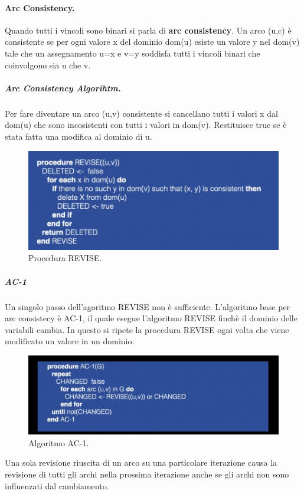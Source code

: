 \paragraph{Arc Consistency.} 
Quando tutti i vincoli sono binari si parla di \textbf{arc consistency}. Un arco (u,c) è consistente se per ogni valore x del dominio dom(u) esiste un valore y nel dom(v) tale che un assegnamento u=x e v=y soddisfa tutti i vincoli binari che coinvolgono sia u che v.

\subparagraph{Arc Consistency Algorihtm.} Per fare diventare un arco (u,v) consistente si cancellano tutti i valori x dal dom(u) che sono incosistenti con tutti i valori in dom(v). Restituisce true se è stata fatta una modifica al dominio di u.
\begin{figure}[H]
    \centering
    \includegraphics[width=13cm, keepaspectratio]{img/arc_consistency.png}
    \caption{Procedura REVISE.}\label{fig:arc_consistency}
\end{figure}


\subparagraph{AC-1} Un singolo passo dell'agoritmo REVISE non è sufficiente. L'algoritmo base per arc consistecy è AC-1, il quale esegue l'algoritmo REVISE finchè il dominio delle variabili cambia. In questo si ripete la procedura REVISE ogni volta che viene modificato un valore in un dominio.
\begin{figure}[H]
    \centering
    \includegraphics[width=13cm, keepaspectratio]{img/ac1_real.png}
    \caption{Algoritmo AC-1.}\label{fig:ac1}
\end{figure}
Una sola revisione riuscita di un arco su una particolare iterazione causa la revisione di tutti gli archi nella prossima iterazione anche se gli archi non sono influenzati dal cambiamento.


